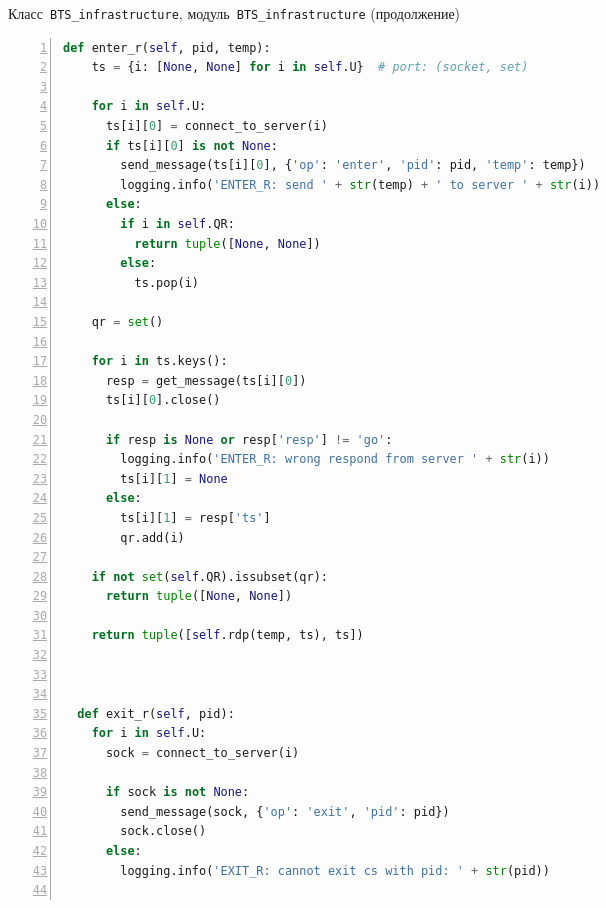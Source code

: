 \begin{ListingEnv}[p]\caption{Класс~\texttt{\small BTS_infrastructure}, модуль~\texttt{\small BTS_infrastructure} (продолжение)}\label{list:bts3}
	\begin{lstlisting}[language=Python, numbers=left]        
  def enter_r(self, pid, temp):
    ts = {i: [None, None] for i in self.U}  # port: (socket, set)
    
    for i in self.U:
      ts[i][0] = connect_to_server(i)
      if ts[i][0] is not None:
        send_message(ts[i][0], {'op': 'enter', 'pid': pid, 'temp': temp})
        logging.info('ENTER_R: send ' + str(temp) + ' to server ' + str(i))
      else:
        if i in self.QR:
          return tuple([None, None])
        else:
          ts.pop(i)

    qr = set()
    
    for i in ts.keys():
      resp = get_message(ts[i][0])
      ts[i][0].close()
      
      if resp is None or resp['resp'] != 'go':
        logging.info('ENTER_R: wrong respond from server ' + str(i))
        ts[i][1] = None
      else:
        ts[i][1] = resp['ts']
        qr.add(i)
        
    if not set(self.QR).issubset(qr):
      return tuple([None, None])

    return tuple([self.rdp(temp, ts), ts])



  def exit_r(self, pid):
    for i in self.U:
      sock = connect_to_server(i)
      
      if sock is not None:
        send_message(sock, {'op': 'exit', 'pid': pid})
        sock.close()
      else:
        logging.info('EXIT_R: cannot exit cs with pid: ' + str(pid))
    
	\end{lstlisting}
\end{ListingEnv}
